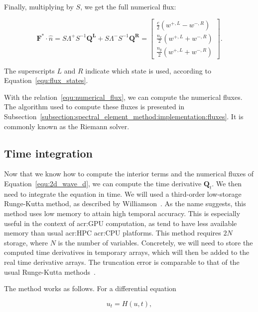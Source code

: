 \noindent
Finally, multiplying by $S$, we get the full numerical flux:

\begin{equation} \label{equ:numerical_flux}
    \mathbf{F}^* \cdot \widehat{n} = 
    S \Lambda^+ S^{-1} \mathbf{\mathbf{Q}^L} + S \Lambda^- S^{-1} \mathbf{\mathbf{Q}^R} =
    \begin{bmatrix}
        \frac{c}{2} \left( w^{+, L} - w^{-, R} \right) \\
        \frac{n_x}{2} \left( w^{+, L} + w^{-, R} \right) \\
        \frac{n_y}{2} \left( w^{+, L} + w^{-, R} \right)
    \end{bmatrix}.
\end{equation}

The superscripts $L$ and $R$ indicate which state is used, according to
Equation~\ref{equ:flux_states}. 

With the relation~\ref{equ:numerical_flux}, we can compute the numerical fluxes. The algorithm used
to compute these fluxes is presented in
Subsection~\ref{subsection:spectral_element_method:implementation:fluxes}. It is commonly known as
the Riemann solver.

\subsection{Time integration} \label{subsection:spectral_element_method:dg_sem:time}

Now that we know how to compute the interior terms and the numerical fluxes of
Equation~\ref{equ:2d_wave_d}, we can compute the time derivative $\mathbf{Q}_t$. We then need to
integrate the equation in time. We will used a third-order low-storage Runge-Kutta method, as
described by Williamson~\cite{Williamson1980}. As the name suggests, this method uses low memory to
attain high temporal accuracy. This is especially useful in the context of \acrshort{acr:GPU}
computation, as  tend to have less available memory than usual
\acrshort{acr:HPC} \acrshort{acr:CPU} platforms. This method requires $2 N$ storage, where $N$ is
the number of variables. Concretely, we will need to store the computed time derivatives in
temporary arrays, which will then be added to the real time derivative arrays. The truncation error
is comparable to that of the usual Runge-Kutta methods~\cite{Williamson1980}.

The method works as follows. For a differential equation

\begin{equation}
	u_t = H(u, t),
\end{equation}


